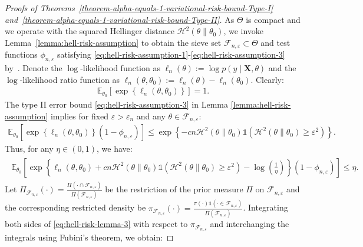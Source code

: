 \documentclass[12pt]{article}
\numberwithin{equation}{section}
\begin{document}
\begin{proof}[Proofs of Theorems~\ref{theorem-alpha-equals-1-variational-risk-bound-Type-I} and~\ref{theorem-alpha-equals-1-variational-risk-bound-Type-II}]
As $\Theta$ is compact and we operate with the squared Hellinger distance $\mathcal{H}^{2}(\theta \parallel \theta_0)$, we invoke Lemma~\ref{lemma:hell-risk-assumption} to obtain the sieve set $\mathcal{F}_{n, \varepsilon} \subset \Theta$ and test functions $\phi_{n, \varepsilon}$ satisfying \eqref{eq:hell-risk-assumption-1}-\eqref{eq:hell-risk-assumption-3} by~\cite{ghosal2007convergence}. Denote the $\log$-likelihood function as $\ell_n(\theta) := \log p(y\mid \mathbf{X}, \theta)$ and the $\log$-likelihood ratio function as $\ell_n(\theta, \theta_0):= \ell_n(\theta) - \ell_n(\theta_0)$. Clearly:
\begin{align}\label{eq:hell-risk-lemma-1}
    \mathbb{E}_{\theta_0}\left[\exp\left\{\ell_n(\theta, \theta_0)\right\}\right] = 1.
\end{align}
The type II error bound \eqref{eq:hell-risk-assumption-3} in Lemma \ref{lemma:hell-risk-assumption} implies for fixed $\varepsilon > \varepsilon_n$ and any $\theta \in \mathcal{F}_{n, \varepsilon}$:
\begin{align}\label{eq:hell-risk-lemma-2}
    \mathbb{E}_{\theta_0}\left[\exp\left\{\ell_n(\theta, \theta_0)\right\}(1 - \phi_{n, \varepsilon})\right] \leq \exp\left\{ - c n \mathcal{H}^{2}(\theta\parallel \theta_0) \mathds{1}(\mathcal{H}^{2}(\theta\parallel \theta_0) \geq \varepsilon^2)\right\}.
\end{align}
Thus, for any $\eta \in (0, 1)$, we have:
\begin{align}\label{eq:hell-risk-lemma-3}
    \begin{split}
        \mathbb{E}_{\theta_0}\left[\exp\left\{\ell_n(\theta, \theta_0) + c n  \mathcal{H}^{2}(\theta\parallel\theta_0)\mathds{1}(\mathcal{H}^{2}(\theta\parallel \theta_0) \geq \varepsilon^2)  - \log\left(\frac{1}{\eta}\right)\right\}(1 - \phi_{n, \varepsilon})\right] \leq \eta.
    \end{split}
\end{align}
Let $\Pi_{\mathcal{F}_{n, \varepsilon}}(\cdot) = \tfrac{\Pi(\cdot \cap \mathcal{F}_{n, \varepsilon})}{\Pi(\mathcal{F}_{n, \varepsilon})}$ be the restriction of the prior measure $\Pi$ on $\mathcal{F}_{n, \varepsilon}$ and the corresponding restricted density be $\pi_{\mathcal{F}_{n, \varepsilon}}(\cdot) = \tfrac{\pi(\cdot) \mathds{1}(\cdot \in \mathcal{F}_{n, \varepsilon})}{\Pi(\mathcal{F}_{n, \varepsilon})}$. Integrating both sides of \eqref{eq:hell-risk-lemma-3} with respect to $\pi_{\mathcal{F}_{n, \varepsilon}}$ and interchanging the integrals using Fubini's theorem, we obtain:

\end{proof}
\end{document}
